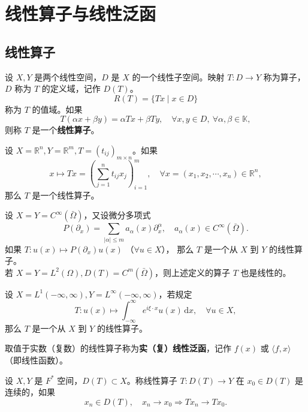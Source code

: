 \documentclass[lang=cn,newtx,10pt,scheme=chinese,thmcnt=chapter]{elegantbook}
\newcommand{\dif}{\mathrm{d}}
\begin{document}
\chapter{线性算子与线性泛函}
\section{线性算子}
\begin{definition}
	设 ${X}, {Y}$ 是两个线性空间，$D$ 是 ${X}$ 的一个线性子空间。映射 $T: D \to {Y}$ 称为算子，$D$ 称为 $T$ 的定义域，记作 $D(T)$。  
	\[
	R(T) = \{T x \mid x \in D\}
	\]
	称为 $T$ 的值域。如果  
	\[
	T(\alpha x + \beta y) = \alpha T x + \beta T y, \quad \forall x, y \in D, \ \forall \alpha, \beta \in \mathbb{K},
	\]
	则称 $T$ 是一个\textbf{线性算子}。
\end{definition}

\begin{example}
	设 ${X} = \mathbb{R}^n, {Y} = \mathbb{R}^m, T = \left(t_{ij}\right)_{m \times n}$。如果  
	\[
	x \mapsto T x = \left( \sum_{j=1}^n t_{ij} x_j \right)_{i=1}^m, \quad \forall x = (x_1, x_2, \cdots, x_n) \in \mathbb{R}^n,
	\]
	那么 $T$ 是一个线性算子。
\end{example}

\begin{example}
	设 ${X} = {Y} = C^\infty(\bar{\Omega})$，又设微分多项式  
	\[
	P\left(\partial_x\right) = \sum_{|\alpha| \leq m} a_\alpha(x) \partial_x^\alpha, \quad a_\alpha(x) \in C^\infty(\bar{\Omega}).
	\]
	如果 $T: u(x) \mapsto P\left(\partial_x\right) u(x)$ （$\forall u \in {X}$），  
	那么 $T$ 是一个从 ${X}$ 到 ${Y}$ 的线性算子。  \\
	若 ${X} = {Y} = L^2(\Omega), D(T) = C^m(\bar{\Omega})$，则上述定义的算子 $T$ 也是线性的。
\end{example}

\begin{example}
	设 ${X} = L^1(-\infty, \infty), {Y} = L^\infty(-\infty, \infty)$，若规定  
	\[
	T: u(x) \mapsto \int_{-\infty}^\infty e^{i \xi \cdot x} u(x) \, \dif x, \quad \forall u \in {X},
	\]
	那么 $T$ 是一个从 ${X}$ 到 ${Y}$ 的线性算子。
\end{example}

\begin{definition}
	取值于实数（复数）的线性算子称为\textbf{实（复）线性泛函}，记作 $f(x)$ 或 $\langle f, x \rangle$（即线性函数）。
\end{definition}

	

	\begin{definition}
		设 ${X}, {Y}$ 是 $F^*$ 空间，$D(T) \subset {X}$。称线性算子 $T: D(T) \to {Y}$ 在 $x_0 \in D(T)$ 是连续的，如果  
		\[
		x_n \in D(T), \quad x_n \to x_0 \Longrightarrow T x_n \to T x_0.
		\]
	\end{definition}
	
\end{document}
